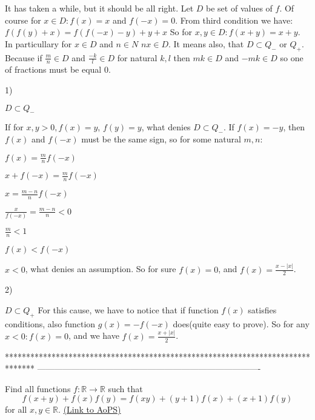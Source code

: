 \begin{solution}
	It has taken a while, but it should be all right.
Let $D$ be set of values of $f$. Of course for $x \in D: f(x)=x$ and $f(-x)=0$. From third condition we have:
 $f(f(y)+x)=f(f(-x)-y)+y+x$
 So for $x,y \in D: f(x+y)=x+y$. In particullary for $x \in D$ and $n \in N$ $nx \in D$. It means also, that $D \subset Q_-$ or $Q_+$. Because if $ \frac{m}{n} \in D$ and $\frac{-k}{l} \in D$ for natural $k,l$ then $mk \in D$ and $-mk \in D$ so one of fractions must be equal 0.

 \begin{bolded}1)\end{bolded} $D \subset Q_-$
 
 If for $x,y>0, f(x)=y$, $f(y)=y$, what denies $D \subset Q_-$.
 If $f(x)=-y$, then $f(x)$ and $f(-x)$ must be the same sign, so for some natural $m,n$:

  $f(x)= \frac{m}{n} f(-x)$ 

  $x+f(-x)=\frac{m}{n} f(-x)$

  $x=\frac{m-n}{n}f(-x)$

  $\frac{x}{f(-x)}=\frac{m-n}{n}<0$

  $\frac{m}{n}<1$ 
 
  $f(x)<f(-x)$
  
  $x<0$, what denies an assumption. So for sure $f(x)=0$, and $f(x)= \frac{x-|x|}{2}$.

 \begin{bolded}2)\end{bolded} $D \subset Q_+$
 For this cause, we have to notice that if function $f(x)$ satisfies conditions, also function $g(x)=-f(-x)$ does(quite easy to prove). So for any $x<0: f(x)=0$, and we have $f(x)= \frac{x+|x|}{2}$.
\end{solution}
*******************************************************************************
-------------------------------------------------------------------------------

\begin{problem}
	Find all functions $f : \mathbb{R} \rightarrow \mathbb{R}$ such that
\[f(x+y) + f(x)f(y) = f(xy) + (y+1)f(x) + (x+1)f(y)\]
for all $x,y \in \mathbb{R}$.
	\flushright \href{https://artofproblemsolving.com/community/c6h470214}{(Link to AoPS)}
\end{problem}



